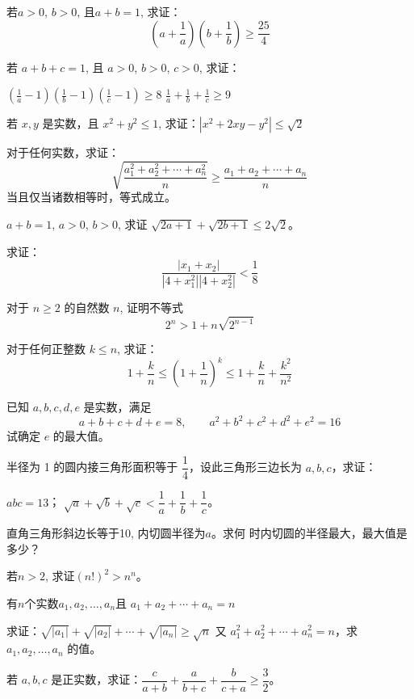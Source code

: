 \begin{Exercise}
\begin{question}
\item 若$a>0$, $b>0$, 且$a+b=1$, 
求证：\[\left(a+\frac{1}{a}\right)\left(b+\frac{1}{b}\right)\geqslant \frac{25}{4}\]

\item 若 $a+b+c=1$, 且 $a>0$, $b>0$, $c>0$, 求证：
\begin{tasks}
    \task $\displaystyle \left(\frac{1}{a}-1\right)\left(\frac{1}{b}-1\right)\left(\frac{1}{c}-1\right)\geqslant 8$
    \task $\displaystyle \frac{1}{a}+\frac{1}{b}+\frac{1}{c}\geqslant 9$
\end{tasks}

\item 若 $x,y$ 是实数，且 $x^2+y^2\leqslant 1$,
求证：$|x^2+2xy-y^2|\leqslant \sqrt{2}$

\item 对于任何实数，求证：
\[\sqrt{\frac{a_1^2+a_2^2+\cdots+a_n^2}{n}}\geqslant \frac{a_1+a_2+\cdots+a_n}{n}\]
当且仅当诸数相等时，等式成立。
\item $a+b=1$, $a>0$, $b>0$, 求证 $\sqrt{2a+1}+\sqrt{2b+1}\leqslant 2\sqrt{2}$。
\item 求证：
\[\frac{|x_1+x_2|}{|4+x_1^2| |4+x_2^2|}<\frac{1}{8}\]
\item 对于 $n\geqslant 2$ 的自然数 $n$, 证明不等式
\[2^n>1+n\sqrt{2^{n-1}}\]
\item 对于任何正整数 $k\leqslant n$, 求证：
\[1+\frac{k}{n}\leqslant \left(1+\frac{1}{n}\right)^k\leqslant 1+\frac{k}{n}+\frac{k^2}{n^2}\]
\item 已知 $a,b,c,d,e$ 是实数，满足
\[a+b+c+d+e=8,\qquad a^2+b^2+c^2+d^2+e^2=16\]
试确定 $e$ 的最大值。
\item 半径为 1 的圆内接三角形面积等于 $\dfrac{1}{4}$，设此三角形三边长为 $a,b,c$，求证：
\begin{tasks}
  \task $abc=13$；
  \task $\sqrt{a}+\sqrt{b}+\sqrt{c}<\dfrac{1}{a}+\dfrac{1}{b}+\dfrac{1}{c}$。
\end{tasks}

\item 直角三角形斜边长等于10, 内切圆半径为$a$。求何
时内切圆的半径最大，最大值是多少？
\item 若$n>2$, 求证$(n!)^2>n^n$。
\item 有$n$个实数$a_1,a_2,\ldots,a_n$且
$a_1+a_2+\cdots+a_n=n$
\begin{tasks}
  \task 求证：$\sqrt{|a_1|}+\sqrt{|a_2|}+\cdots+\sqrt{|a_n|}\geqslant \sqrt{n}$
  \task 又 $a^2_1+a_2^2+\cdots+a^2_n=n$，求 $a_1,a_2,\ldots,a_n$ 的值。
\end{tasks}

\item 若 $a,b,c$ 是正实数，求证：$\dfrac{c}{a+b}+\dfrac{a}{b+c}+\dfrac{b}{c+a}\geqslant \dfrac{3}{2}$。
\end{question}
\end{Exercise}

